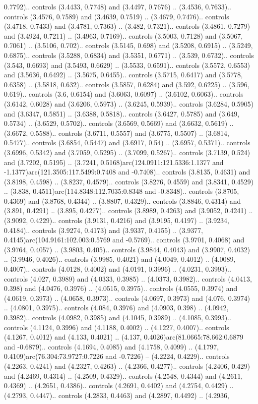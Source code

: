 0.7792).. controls (3.4433, 0.7748) and (3.4497, 0.7676) .. (3.4536, 0.7633).. controls (3.4576, 0.7589) and (3.4639, 0.7519) .. (3.4679, 0.7476).. controls (3.4718, 0.7433) and (3.4781, 0.7363) .. (3.482, 0.7321).. controls (3.4861, 0.7279) and (3.4924, 0.7211) .. (3.4963, 0.7169).. controls (3.5003, 0.7128) and (3.5067, 0.7061) .. (3.5106, 0.702).. controls (3.5145, 0.698) and (3.5208, 0.6915) .. (3.5249, 0.6875).. controls (3.5288, 0.6834) and (3.5351, 0.6771) .. (3.539, 0.6732).. controls (3.543, 0.6693) and (3.5493, 0.6629) .. (3.5533, 0.6591).. controls (3.5572, 0.6553) and (3.5636, 0.6492) .. (3.5675, 0.6455).. controls (3.5715, 0.6417) and (3.5778, 0.6358) .. (3.5818, 0.632).. controls (3.5857, 0.6284) and (3.592, 0.6225) .. (3.596, 0.619).. controls (3.6, 0.6154) and (3.6063, 0.6097) .. (3.6102, 0.6063).. controls (3.6142, 0.6028) and (3.6206, 0.5973) .. (3.6245, 0.5939).. controls (3.6284, 0.5905) and (3.6347, 0.5851) .. (3.6388, 0.5818).. controls (3.6427, 0.5785) and (3.649, 0.5734) .. (3.6529, 0.5702).. controls (3.6569, 0.5669) and (3.6632, 0.5619) .. (3.6672, 0.5588).. controls (3.6711, 0.5557) and (3.6775, 0.5507) .. (3.6814, 0.5477).. controls (3.6854, 0.5447) and (3.6917, 0.54) .. (3.6957, 0.5371).. controls (3.6996, 0.5342) and (3.7059, 0.5295) .. (3.7099, 0.5267).. controls (3.7139, 0.524) and (3.7202, 0.5195) .. (3.7241, 0.5168)arc(124.0911:121.5336:1.1377 and -1.1377)arc(121.3505:117.5499:0.7408 and -0.7408).. controls (3.8135, 0.4631) and (3.8198, 0.4598) .. (3.8237, 0.4579).. controls (3.8276, 0.4559) and (3.8341, 0.4529) .. (3.838, 0.4511)arc(114.8348:112.7035:0.8348 and -0.8348).. controls (3.8705, 0.4369) and (3.8768, 0.4344) .. (3.8807, 0.4329).. controls (3.8846, 0.4314) and (3.891, 0.4291) .. (3.895, 0.4277).. controls (3.8989, 0.4263) and (3.9052, 0.4241) .. (3.9092, 0.4229).. controls (3.9131, 0.4216) and (3.9195, 0.4197) .. (3.9234, 0.4184).. controls (3.9274, 0.4173) and (3.9337, 0.4155) .. (3.9377, 0.4145)arc(104.9161:102.003:0.5769 and -0.5769).. controls (3.9701, 0.4068) and (3.9764, 0.4057) .. (3.9803, 0.405).. controls (3.9844, 0.4043) and (3.9907, 0.4032) .. (3.9946, 0.4026).. controls (3.9985, 0.4021) and (4.0049, 0.4012) .. (4.0089, 0.4007).. controls (4.0128, 0.4002) and (4.0191, 0.3996) .. (4.0231, 0.3993).. controls (4.027, 0.3989) and (4.0333, 0.3985) .. (4.0373, 0.3982).. controls (4.0413, 0.398) and (4.0476, 0.3976) .. (4.0515, 0.3975).. controls (4.0555, 0.3974) and (4.0619, 0.3973) .. (4.0658, 0.3973).. controls (4.0697, 0.3973) and (4.076, 0.3974) .. (4.0801, 0.3975).. controls (4.084, 0.3976) and (4.0903, 0.398) .. (4.0942, 0.3982).. controls (4.0982, 0.3985) and (4.1045, 0.3989) .. (4.1085, 0.3993).. controls (4.1124, 0.3996) and (4.1188, 0.4002) .. (4.1227, 0.4007).. controls (4.1267, 0.4012) and (4.133, 0.4021) .. (4.137, 0.4026)arc(81.0665:78.662:0.6879 and -0.6879).. controls (4.1694, 0.4085) and (4.1758, 0.4099) .. (4.1797, 0.4109)arc(76.304:73.9727:0.7226 and -0.7226) -- (4.2224, 0.4229).. controls (4.2263, 0.4241) and (4.2327, 0.4263) .. (4.2366, 0.4277).. controls (4.2406, 0.429) and (4.2469, 0.4314) .. (4.2509, 0.4329).. controls (4.2548, 0.4344) and (4.2611, 0.4369) .. (4.2651, 0.4386).. controls (4.2691, 0.4402) and (4.2754, 0.4429) .. (4.2793, 0.4447).. controls (4.2833, 0.4463) and (4.2897, 0.4492) .. (4.2936, 